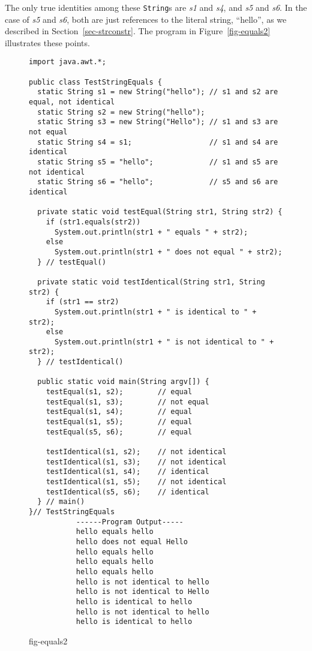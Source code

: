 \noindent The only true identities among these {\tt String}s are {\it s1} and {\it s4},
and {\it s5} and {\it s6}.  In the case of {\it s5} and {\it s6}, both
are just references to the literal string, ``hello'', as we described
in Section~\ref{sec-strconstr}.  The program in Figure~\ref{fig-equals2}
illustrates these points. 

\begin{figure}[p]
\jjjprogstart
\begin{jjjlisting}[35pc]
\begin{lstlisting}
import java.awt.*;

public class TestStringEquals {
  static String s1 = new String("hello"); // s1 and s2 are equal, not identical
  static String s2 = new String("hello");
  static String s3 = new String("Hello"); // s1 and s3 are not equal
  static String s4 = s1;                  // s1 and s4 are identical
  static String s5 = "hello";             // s1 and s5 are not identical
  static String s6 = "hello";             // s5 and s6 are identical

  private static void testEqual(String str1, String str2) {
    if (str1.equals(str2))
      System.out.println(str1 + " equals " + str2);
    else
      System.out.println(str1 + " does not equal " + str2);
  } // testEqual()

  private static void testIdentical(String str1, String str2) {
    if (str1 == str2)
      System.out.println(str1 + " is identical to " + str2);
    else
      System.out.println(str1 + " is not identical to " + str2);
  } // testIdentical()

  public static void main(String argv[]) {
    testEqual(s1, s2);        // equal
    testEqual(s1, s3);        // not equal
    testEqual(s1, s4);        // equal
    testEqual(s1, s5);        // equal
    testEqual(s5, s6);        // equal

    testIdentical(s1, s2);    // not identical
    testIdentical(s1, s3);    // not identical
    testIdentical(s1, s4);    // identical
    testIdentical(s1, s5);    // not identical
    testIdentical(s5, s6);    // identical
  } // main()
}// TestStringEquals
           ------Program Output-----
           hello equals hello
           hello does not equal Hello
           hello equals hello
           hello equals hello
           hello equals hello
           hello is not identical to hello
           hello is not identical to Hello
           hello is identical to hello
           hello is not identical to hello
           hello is identical to hello
\end{lstlisting}
\end{jjjlisting}
{fig-equals2}
\end{figure}

